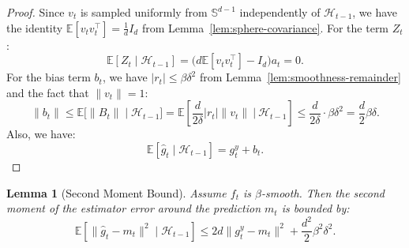\documentclass[journal,onecolumn]{IEEEtran}
\theoremstyle{plain}
\newtheorem{lemma}[theorem]{Lemma}
\theoremstyle{definition}
\theoremstyle{remark}
\begin{document}
{\begin{proof}
    Since $v_{t}$ is sampled uniformly from $\mathbb{S}^{d-1}$ independently of $\mathcal{H}
    _{t-1}$, we have the identity
    $\mathbb{E}[v_{t}v_{t}^{\top}] = \frac{1}{d}I_{d}$ from Lemma~\ref{lem:sphere-covariance}.
    For the term $Z_{t}$:
    \begin{equation*}
        \mathbb{E}[Z_{t}\mid \mathcal{H}_{t-1}]= \big(d\mathbb{E}[v_{t}v_{t}^{\top}
        ]-I_{d}\big)a_{t}= 0.
    \end{equation*}
    For the bias term $b_{t}$, we have $|r_{t}|\le \beta\delta^{2}$ from Lemma~\ref{lem:smoothness-remainder}
    and the fact that $\|v_{t}\|=1$:
    \begin{equation*}
        \|b_{t}\|\le\mathbb{E}\big[\|B_{t}\|\mid \mathcal{H}_{t-1}\big]= \mathbb{E}
        \left[ \frac{d}{2\delta}|r_{t}| \|v_{t}\| \ \Big|\ \mathcal{H}_{t-1}\right]\le \frac{d}{2\delta}\cdot \beta\delta^{2}=\frac{d}{2}\beta\delta.
    \end{equation*}
    Also, we have:
    \begin{equation*}
        \mathbb{E}[\hat g_{t}\mid \mathcal{H}_{t-1}] = g_{t}^{y}+ b_{t}.
    \end{equation*}
\end{proof}

\begin{lemma}[Second Moment Bound]
    \label{lem:second-moment-center} Assume $f_{t}$ is $\beta$-smooth. Then the
    second moment of the estimator error around the prediction $m_{t}$ is
    bounded by:
    \begin{equation*}
        \mathbb{E}\left[\|\hat g_{t}-m_{t}\|^{2}\mid \mathcal{H}_{t-1}\right]\le
        2d\|g_{t}^{y}-m_{t}\|^{2}+ \frac{d^{2}}{2}\beta^{2}\delta^{2}.
    \end{equation*}
\end{lemma}

}
\end{document}
